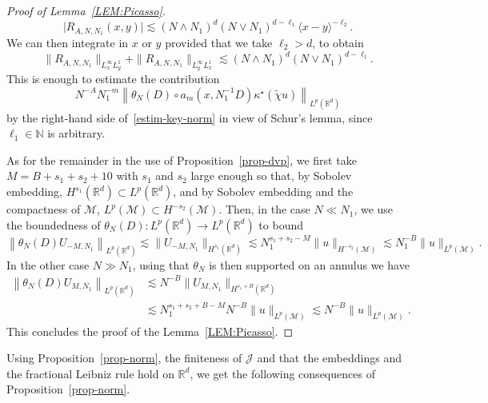 \documentclass[AHL,Unicode,longabstracts,published]{cedram}
\newcommand{\R}{\mathbb{R}}
\newcommand{\N}{\mathbb{N}}
\newcommand{\J}{\mathcal{J}}
\newcommand{\M}{\mathcal{M}}
\newcommand{\kk}{\kappa}
\newcommand{\wt}{\widetilde}
\newcommand{\les}{\lesssim}
\newcommand{\jb}[1] {\langle #1 \rangle}
\begin{document}
\begin{proof}[Proof of Lemma~\ref{LEM:Picasso}]
\begin{equation*}
\big|R_{A,N,N_1}(x,y)\big|\les (N\wedge N_1)^d(N\vee N_1)^{d-\ell_1}\jb{x-y}^{-\ell_2}.
\end{equation*}
We can then integrate in $x$ or $y$ provided that we take $\ell_2>d$, to obtain
\begin{equation*}
\|R_{A,N,N_1}\|_{L^{\infty}_x L^1_y}+\|R_{A,N,N_1}\|_{L^{\infty}_yL^1_x }\les (N\wedge N_1)^{d}(N\vee N_1)^{d-\ell_1}.
\end{equation*}
This is enough to estimate the contribution
\begin{equation*}
N^{-A}N_1^{-m}\left\|\theta_N(D)\circ a_{m}\left(x,N_1^{-1}D\right)\kk^{\star}(\wt\chi u)\right\|_{L^p(\R^d)}
\end{equation*}
by the right-hand side of~\eqref{estim-key-norm} in view of Schur's lemma, since $\ell_1\in\N$ is arbitrary.

As for the remainder in the use of Proposition~\ref{prop-dvp}, we first take $M=B+s_1+s_2+10$ with $s_1$ and $s_2$ large enough so that, by Sobolev embedding, $H^{s_1}(\R^d)\subset L^p(\R^d)$, and by Sobolev embedding and the compactness of $\M$, $L^p(\M)\subset H^{-s_2}(\M)$. Then, in the case $N\ll N_1$, we use the boundedness of $\theta_N(D): L^p(\R^d)\rightarrow L^p(\R^d)$ to bound
\begin{equation*}
\left\|\theta_N(D)U_{-M,N_1}\right\|_{L^p(\R^d)}\les \|U_{-M,N_1}\|_{H^{s_1}(\R^d)}\les N_1^{s_1+s_2-M}\|u\|_{H^{-s_2}(\M)} \les N_1^{-B}\|u\|_{L^p(\M)}.
\end{equation*}
In the other case $N\gg N_1$, using that $\theta_N$ is then supported on an annulus we have
\begin{align*}
\left\|\theta_N(D)U_{M,N_1}\right\|_{L^p(\R^d)}&\les N^{-B}\|U_{M,N_1}\|_{H^{s_1+B}(\R^d)}\\
&\les N_1^{s_1+s_2+B-M} N^{-B}\|u\|_{L^p(\M)}\les N^{-B}\|u\|_{L^p(\M)}.
\end{align*}
This concludes the proof of the Lemma~\ref{LEM:Picasso}.
\end{proof}

Using Proposition~\ref{prop-norm}, the finiteness of $\J$ and that the embeddings and the fractional Leibniz rule hold on $\R^d$, we get the following consequences of Proposition~\ref{prop-norm}.
\end{document}

